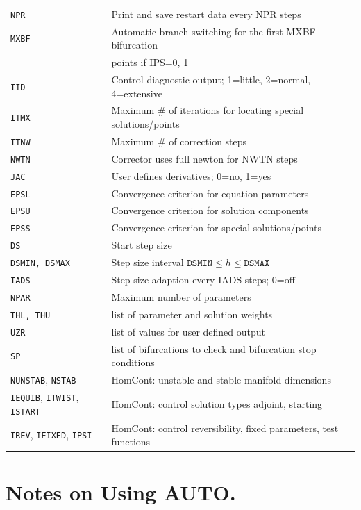 \documentclass[12pt]{report}
\begin{document}
\begin{tabular}{|l|l|}
\hline
{\tt NPR} & Print and save restart data every NPR steps \\
{\tt MXBF} & Automatic branch switching for the first MXBF bifurcation \\
 	  & points if IPS=0, 1 	 \\
{\tt IID} & Control diagnostic output; 1=little, 2=normal, 4=extensive \\
{\tt ITMX} & Maximum \# of iterations for locating special solutions/points \\
{\tt ITNW} & Maximum \# of correction steps \\
{\tt NWTN} & Corrector uses full newton for NWTN steps \\
{\tt JAC}  & User defines derivatives; 0=no, 1=yes \\
\hline
{\tt EPSL} & Convergence criterion for equation parameters \\
{\tt EPSU} & Convergence criterion for solution components \\
{\tt EPSS} & Convergence criterion for special solutions/points \\
\hline
{\tt DS}  & Start step size \\
{\tt DSMIN, DSMAX} & Step size interval $\mathtt{DSMIN} \leq h \leq \mathtt{DSMAX}$ \\
{\tt IADS} & Step size adaption every IADS steps; 0=off \\
\hline
{\tt NPAR} & Maximum number of parameters \\
{\tt THL, THU} & list of parameter and solution weights \\
\hline
{\tt UZR} & list of values for user defined output\\
{\tt SP} & list of bifurcations to check and bifurcation stop
conditions\\
\hline
{\tt NUNSTAB}, {\tt NSTAB} & HomCont: unstable and stable manifold dimensions\\
{\tt IEQUIB}, {\tt ITWIST}, {\tt ISTART} & HomCont: control solution types
adjoint, starting\\
{\tt IREV}, {\tt IFIXED}, {\tt IPSI} & HomCont: control reversibility, fixed
parameters, test functions\\
\hline
\end{tabular}

 

\chapter{ Notes on Using {\cal AUTO}.}  \label{ch:Notes_on_Using_AUTO}
\end{document}
